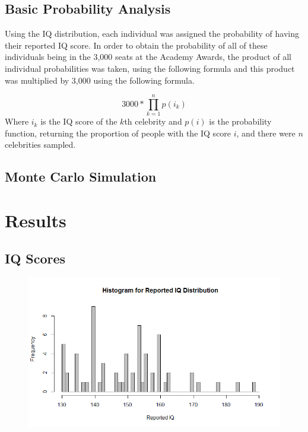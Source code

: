 \documentclass[12pt,letterpaper,titlepage,oneside,draft]{article}
\begin{document}
\subsection{Basic Probability Analysis}
\label{probanal}
Using the IQ distribution, each individual was assigned the probability of having their reported IQ score. In order to obtain the probability of all of these individuals being in the 3,000 seats at the Academy Awards, the product of all individual probabilities was taken, using the following formula and this product was multiplied by 3,000 using the following formula.

\begin{equation}
3000 * \prod_{k=1}^n p(i_k)
\end{equation}
Where $i_k$ is the IQ score of the $k$th celebrity and $p(i)$ is the probability function, returning the proportion of people with the IQ score $i$, and there were $n$ celebrities sampled.

\subsection{Monte Carlo Simulation} 

\section{Results}
\subsection{IQ Scores}

\begin{figure}
\caption{}
\label{iqhist}
\includegraphics[scale=.5]{histogram}
\end{figure}
\end{document}
